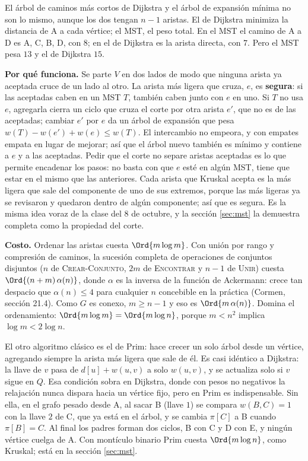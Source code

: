 \documentclass[11pt,letterpaper]{article}
\begin{document}
\begin{ojo}
  El árbol de caminos más cortos de Dijkstra y el árbol de expansión
  mínima no son lo mismo, aunque los dos tengan $n - 1$ aristas. El de
  Dijkstra minimiza la distancia de A a cada vértice; el MST, el peso
  total. En el MST el camino de A a D es A, C, B, D, con $8$; en el de
  Dijkstra es la arista directa, con $7$. Pero el MST pesa $13$ y el de
  Dijkstra $15$.
\end{ojo}

\textbf{Por qué funciona.} Se parte $V$ en dos lados de modo que
ninguna arista ya aceptada cruce de un lado al otro. La arista más
ligera que cruza, $e$, es \textbf{segura}: si las aceptadas caben en
un MST $T$, también caben junto con $e$ en uno. Si $T$ no usa $e$,
agregarla cierra un ciclo que cruza el corte por otra arista $e'$, que
no es de las aceptadas; cambiar $e'$ por $e$ da un árbol de expansión
que pesa $w(T) - w(e') + w(e) \leq w(T)$. El intercambio no empeora,
y con empates empata en lugar de mejorar; así que el árbol nuevo
también es mínimo y contiene a $e$ y a las aceptadas. Pedir que el
corte no separe aristas aceptadas es lo que permite encadenar los
pasos: no basta con que $e$ esté en algún MST, tiene que estar en el
mismo que las anteriores. Cada arista que Kruskal acepta es la más
ligera que sale del componente de uno de sus extremos, porque las más
ligeras ya se revisaron y quedaron dentro de algún componente; así que
es segura. Es la misma idea voraz de la clase del 8 de octubre, y la
sección \ref{sec:mst} la demuestra completa como la propiedad del
corte.

\textbf{Costo.} Ordenar las aristas cuesta $\Ord{m \log m}$. Con unión
por rango y compresión de caminos, la sucesión completa de operaciones
de conjuntos disjuntos ($n$ de \textsc{Crear-Conjunto}, $2m$ de
\textsc{Encontrar} y $n - 1$ de \textsc{Unir}) cuesta
$\Ord{(n + m)\,\alpha(n)}$, donde $\alpha$ es la inversa de la función
de Ackermann: crece tan despacio que $\alpha(n) \leq 4$ para cualquier
$n$ concebible en la práctica (Cormen, sección 21.4). Como $G$ es
conexo, $m \geq n - 1$ y eso es $\Ord{m\,\alpha(n)}$. Domina el
ordenamiento: $\Ord{m \log m} = \Ord{m \log n}$, porque $m < n^2$
implica $\log m < 2 \log n$.

\begin{observacion}
  El otro algoritmo clásico es el de Prim: hace crecer un solo árbol
  desde un vértice, agregando siempre la arista más ligera que sale de
  él. Es casi idéntico a Dijkstra: la llave de $v$ pasa de
  $d[u] + w(u, v)$ a solo $w(u, v)$, y se actualiza solo si $v$ sigue
  en $Q$. Esa condición sobra en Dijkstra, donde con pesos no
  negativos la relajación nunca dispara hacia un vértice fijo, pero en
  Prim es indispensable. Sin ella, en el grafo pesado desde A, al
  sacar B (llave $1$) se compara $w(B, C) = 1$ con la llave $2$ de C,
  que ya está en el árbol, y se cambia $\pi[C]$ a B cuando
  $\pi[B] = C$. Al final los padres forman dos ciclos, B con C y D con
  E, y ningún vértice cuelga de A. Con montículo binario Prim cuesta
  $\Ord{m \log n}$, como Kruskal; está en la sección \ref{sec:mst}.
\end{observacion}
\end{document}
